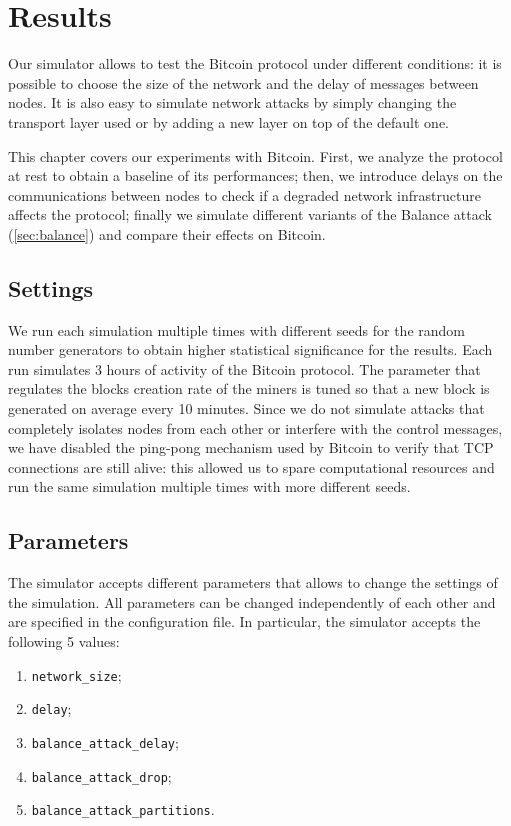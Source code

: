 \def \myextraleftmargin {-0.2cm}
\def \myplotswitdth {0.95}

\chapter{Results}
\label{chapter:results}
Our simulator allows to test the Bitcoin protocol under different conditions:
it is possible to choose the size of the network and the delay of messages between nodes.
It is also easy to simulate network attacks by simply changing the transport layer used or by adding a new layer on top of the default one.

\medskip
This chapter covers our experiments with Bitcoin.
First, we analyze the protocol at rest to obtain a baseline of its performances;
then, we introduce delays on the communications between nodes to check if a degraded network infrastructure affects the protocol;
finally we simulate different variants of the Balance attack (\cref{sec:balance}) and compare their effects on Bitcoin.


\section{Settings}
We run each simulation multiple times with different seeds for the random number generators to obtain higher statistical significance for the results.
Each run simulates \num{3} hours of activity of the Bitcoin protocol.
The parameter that regulates the blocks creation rate of the miners is tuned so that a new block is generated on average every \num{10} minutes.
Since we do not simulate attacks that completely isolates nodes from each other or interfere with the control messages, we have disabled the ping-pong mechanism used by Bitcoin to verify that TCP connections are still alive:
this allowed us to spare computational resources and run the same simulation multiple times with more different seeds.


\section{Parameters}
The simulator accepts different parameters that allows to change the settings of the simulation.
All parameters can be changed independently of each other and are specified in the configuration file.
In particular, the simulator accepts the following \num{5} values:
\begin{enumerate}
	\item \texttt{network\_size};
	\item \texttt{delay};
	\item \texttt{balance\_attack\_delay};
	\item \texttt{balance\_attack\_drop};
	\item \texttt{balance\_attack\_partitions}.
\end{enumerate}

